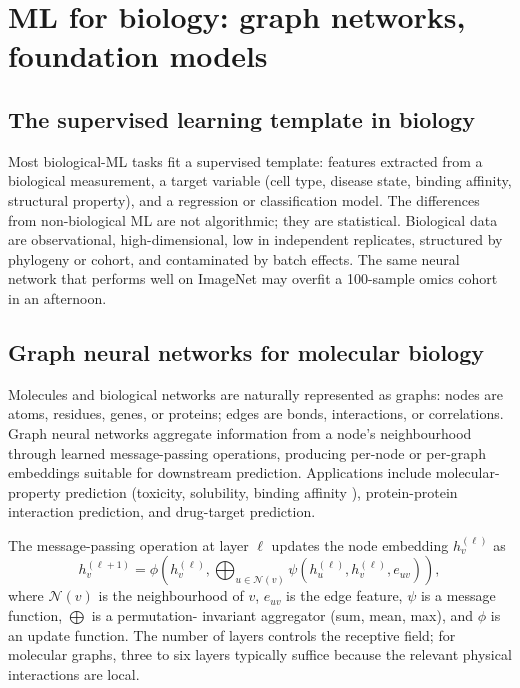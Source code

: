 \section{ML for biology: graph networks, foundation models}

\subsection{The supervised learning template in biology}

Most biological-ML tasks fit a supervised template: features extracted
from a biological measurement, a target variable (cell type, disease
state, binding affinity, structural property), and a regression or
classification model. The differences from non-biological ML are not
algorithmic; they are statistical. Biological data are observational,
high-dimensional, low in independent replicates, structured by
phylogeny or cohort, and contaminated by batch effects. The same
neural network that performs well on ImageNet may overfit a 100-sample
omics cohort in an afternoon.

\subsection{Graph neural networks for molecular biology}

Molecules and biological networks are naturally represented as graphs:
nodes are atoms, residues, genes, or proteins; edges are bonds,
interactions, or correlations. Graph neural networks aggregate
information from a node's neighbourhood through learned message-passing
operations, producing per-node or per-graph embeddings suitable for
downstream prediction. Applications include molecular-property
prediction (toxicity, solubility, binding affinity
\cite{paper:v6c11-stark-graphnn-2022}), protein-protein interaction
prediction, and drug-target prediction.

The message-passing operation at layer $\ell$ updates the node
embedding $h_v^{(\ell)}$ as
\[
h_v^{(\ell+1)} = \phi\!\left( h_v^{(\ell)}, \bigoplus_{u \in \mathcal{N}(v)}
\psi(h_u^{(\ell)}, h_v^{(\ell)}, e_{uv}) \right),
\]
where $\mathcal{N}(v)$ is the neighbourhood of $v$, $e_{uv}$ is the edge
feature, $\psi$ is a message function, $\bigoplus$ is a permutation-
invariant aggregator (sum, mean, max), and $\phi$ is an update function.
The number of layers controls the receptive field; for molecular
graphs, three to six layers typically suffice because the relevant
physical interactions are local.

